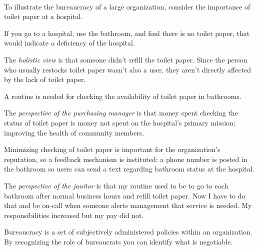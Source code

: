 \ \\
To illustrate the bureaucracy of a large organization, consider the importance of toilet paper at a hospital. 
\begin{mdframed}[frametitle={Restocking Toilet Paper},frametitlerule=true,frametitlealignment=\centering]
If you go to a hospital, use the bathroom, and find there is no toilet paper, that would indicate a deficiency of the hospital.

The \textit{holistic view} is that someone didn't refill the toilet paper. Since the person who usually restocks toilet paper wasn't also a user, they aren't directly affected by the lack of toilet paper.

A routine is needed for checking the availability of toilet paper in bathrooms. 

The \textit{perspective of the purchasing manager} is that money spent checking the status of toilet paper is money not spent on the hospital's primary mission: improving the health of community members.

Minimizing checking of toilet paper is important for the organization's reputation, so a feedback mechanism is instituted: a phone number is posted in the bathroom so users can send a text regarding bathroom status at the hospital.

The \textit{perspective of the janitor} is that my routine used to be to go to each bathroom after normal business hours and refill toilet paper. Now I have to do that and be on-call when someone alerts management that service is needed. My responsibilities increased but my pay did not.

\end{mdframed}






Bureaucracy is a set of subjectively administered policies within an organization. By recognizing the role of bureaucrats you can identify what is negotiable. 
